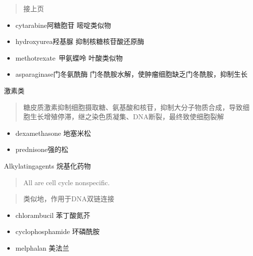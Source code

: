 \documentclass[
  ignorenonframetext,
]{beamer}
\begin{document}
\begin{frame}
\begin{quote}
接上页
\end{quote}

\begin{itemize}
\item
  cytarabine阿糖胞苷 嘧啶类似物
\item
  hydroxyurea羟基脲 抑制核糖核苷酸还原酶
\item
  methotrexate~甲氨蝶呤 叶酸类似物
\item
  asparaginase门冬氨酰酶 门冬酰胺水解，使肿瘤细胞缺乏门冬酰胺，抑制生长
\end{itemize}
\end{frame}

\begin{frame}
\begin{block}{激素类}
\protect\hypertarget{ux6fc0ux7d20ux7c7b}{}
\begin{quote}
糖皮质激素抑制细胞摄取糖、氨基酸和核苷，抑制大分子物质合成，导致细胞生长增殖停滞，继之染色质凝集、DNA断裂，最终致使细胞裂解
\end{quote}

\begin{itemize}
\item
  dexamethasone 地塞米松
\item
  prednisone强的松
\end{itemize}
\end{block}
\end{frame}

\begin{frame}
\begin{block}{Alkylatingagents 烷基化药物}
\protect\hypertarget{alkylatingagents-ux70f7ux57faux5316ux836fux7269}{}
\begin{quote}
All are cell cycle nonspecific.
\end{quote}

\begin{quote}
类似地，作用于DNA双链连接
\end{quote}

\begin{itemize}
\item
  chlorambucil 苯丁酸氮芥
\item
  cyclophosphamide 环磷酰胺
\item
  melphalan 美法兰
\end{itemize}
\end{block}
\end{frame}
\end{document}
